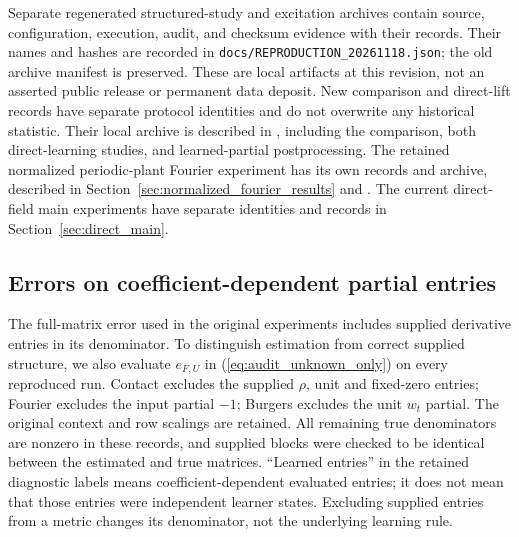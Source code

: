 Separate regenerated structured-study and excitation archives contain source,
configuration, execution, audit, and checksum evidence with their records.
Their names and hashes are recorded in
\texttt{docs/REPRODUCTION\_20261118.json}; the old archive manifest is
preserved. These are local artifacts at this revision, not an asserted
public release or permanent data deposit. New comparison and direct-lift
records have separate protocol identities and do not overwrite any historical
statistic. Their local archive is described in
, including the comparison,
both direct-learning studies, and learned-partial postprocessing.
The retained normalized periodic-plant Fourier experiment has its own records and archive,
described in Section~\ref{sec:normalized_fourier_results} and
. The current direct-field
main experiments have separate identities and records in
Section~\ref{sec:direct_main}.

\subsection{Errors on coefficient-dependent partial entries}
The full-matrix error used in the original experiments includes supplied
derivative entries in its denominator. To distinguish estimation from
correct supplied structure, we also evaluate $e_{F,U}$ in
(\ref{eq:audit_unknown_only}) on every reproduced run. Contact excludes
the supplied $\rho$, unit and fixed-zero entries; Fourier excludes the
input partial $-1$; Burgers excludes the unit $w_t$ partial. The original
context and row scalings are retained. All remaining true denominators
are nonzero in these records, and supplied blocks were checked to be
identical between the estimated and true matrices. ``Learned entries'' in
the retained diagnostic labels means coefficient-dependent evaluated
entries; it does not mean that those entries were independent learner
states. Excluding supplied entries from a metric changes its denominator,
not the underlying learning rule.

\begin{table}[t]
\centering
\caption{Reproduced original protocols: late-window evaluated-partial
errors, mean $\pm$ sample standard deviation across all ten seeds.
Contact uses $[100,120)$~s, Fourier $[60,80)$~s, and Burgers $[18,24)$~s.
Contact and Burgers use saved $0.1$-s partial snapshots; Fourier uses all
$0.01$-s records. Consequently snapshot averages need not equal the
original all-step means. Different physical scalings prevent interpreting
the rows as a comparison of difficulty across systems.}
\label{tab:unknown_partials}

\end{table}

